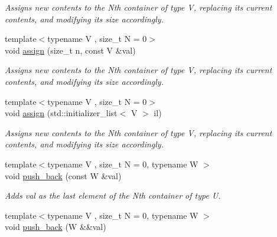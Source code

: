 \begin{DoxyCompactItemize}
\begin{DoxyCompactList}\small\item\em Assigns new contents to the Nth container of type V, replacing its current contents, and modifying its size accordingly. \end{DoxyCompactList}\item 
\hypertarget{classheterogeneous_1_1heterovector_3_01_t_01_4_a21ddf17430db9fe04e6fc4a3c081e224}{}{\footnotesize template$<$typename V , size\+\_\+t N = 0$>$ }\\void \hyperlink{classheterogeneous_1_1heterovector_3_01_t_01_4_a21ddf17430db9fe04e6fc4a3c081e224}{assign} (size\+\_\+t n, const V \&val)\label{classheterogeneous_1_1heterovector_3_01_t_01_4_a21ddf17430db9fe04e6fc4a3c081e224}

\begin{DoxyCompactList}\small\item\em Assigns new contents to the Nth container of type V, replacing its current contents, and modifying its size accordingly. \end{DoxyCompactList}\item 
\hypertarget{classheterogeneous_1_1heterovector_3_01_t_01_4_a509520f8e2920be6db5ac3d0307a03f9}{}{\footnotesize template$<$typename V , size\+\_\+t N = 0$>$ }\\void \hyperlink{classheterogeneous_1_1heterovector_3_01_t_01_4_a509520f8e2920be6db5ac3d0307a03f9}{assign} (std\+::initializer\+\_\+list$<$ V $>$ il)\label{classheterogeneous_1_1heterovector_3_01_t_01_4_a509520f8e2920be6db5ac3d0307a03f9}

\begin{DoxyCompactList}\small\item\em Assigns new contents to the Nth container of type V, replacing its current contents, and modifying its size accordingly. \end{DoxyCompactList}\item 
\hypertarget{classheterogeneous_1_1heterovector_3_01_t_01_4_a66844cc5f2edeb0cb72facd61b2bb2d1}{}{\footnotesize template$<$typename V , size\+\_\+t N = 0, typename W $>$ }\\void \hyperlink{classheterogeneous_1_1heterovector_3_01_t_01_4_a66844cc5f2edeb0cb72facd61b2bb2d1}{push\+\_\+back} (const W \&val)\label{classheterogeneous_1_1heterovector_3_01_t_01_4_a66844cc5f2edeb0cb72facd61b2bb2d1}

\begin{DoxyCompactList}\small\item\em Adds val as the last element of the Nth container of type U. \end{DoxyCompactList}\item 
\hypertarget{classheterogeneous_1_1heterovector_3_01_t_01_4_a3ba13a7cd3f4fb8452b61f2a38a4f43f}{}{\footnotesize template$<$typename V , size\+\_\+t N = 0, typename W $>$ }\\void \hyperlink{classheterogeneous_1_1heterovector_3_01_t_01_4_a3ba13a7cd3f4fb8452b61f2a38a4f43f}{push\+\_\+back} (W \&\&val)\label{classheterogeneous_1_1heterovector_3_01_t_01_4_a3ba13a7cd3f4fb8452b61f2a38a4f43f}


\end{DoxyCompactItemize}
